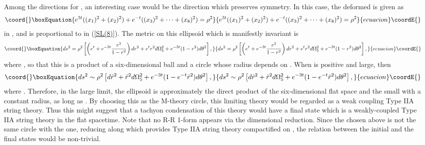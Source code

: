 \documentclass[a4paper,a4paper]{article}
\begin{document}
Among the directions for \coordHE{}, an interesting case would be the direction which preserves 
\coordHE{} symmetry. 
In this case, the deformed \coordHE{} is given as 
\begin{equation}\coord{}\boxEquation{
e^{3t}((x_1)^2+(x_2)^2)+e^{-t}((x_3)^2+\cdots+(x_8)^2)=\rho^2
}{
e^{3t}((x_1)^2+(x_2)^2)+e^{-t}((x_3)^2+\cdots+(x_8)^2)=\rho^2
}{ecuacion}\coordE{}\end{equation}
in \coordHE{}, and \coordHE{} is proportional to \coordHE{} in (\ref{SL(8)}). 
The metric on this ellipsoid which is manifestly \coordHE{} invariant is 
\begin{equation}\coord{}\boxEquation{
ds^2 = \rho^2\left[ \left(e^t+e^{-3t}\frac{r^2}{1-r^2}\right)dr^2+e^tr^2d\Omega_5^2+e^{-3t}(1-r^2)d\theta^2
       \right],
}{
ds^2 = \rho^2\left[ \left(e^t+e^{-3t}\frac{r^2}{1-r^2}\right)dr^2+e^tr^2d\Omega_5^2+e^{-3t}(1-r^2)d\theta^2
       \right],
}{ecuacion}\coordE{}\end{equation}
where \coordHE{}, so that this is a product of a six-dimensional ball and a circle whose radius depends on \coordHE{}. 
When \coordHE{} is positive and large, then 
\begin{equation}\coord{}\boxEquation{
ds^2 \sim \rho^2\left[ d\tilde{r}^2+\tilde{r}^2d\Omega_5^2+e^{-3t}(1-e^{-t}\tilde{r}^2)d\theta^2\right],
}{
ds^2 \sim \rho^2\left[ d\tilde{r}^2+\tilde{r}^2d\Omega_5^2+e^{-3t}(1-e^{-t}\tilde{r}^2)d\theta^2\right],
}{ecuacion}\coordE{}\end{equation}
where \coordHE{}. 
Therefore, in the large \coordHE{} limit, the ellipsoid is approximately the direct product of the six-dimensional flat 
space and the small \coordHE{} with a constant radius, as long as \coordHE{}. 
By choosing this \coordHE{} as the M-theory circle, this limiting theory would be regarded as a weak coupling 
Type IIA string theory. 
Thus this might suggest that a tachyon condensation of this theory would have a final state which is a 
weakly-coupled Type IIA string theory in the flat spacetime. 
Note that no R-R 1-form appears via the dimensional reduction. 
Since the \coordHE{} chosen above is not the same circle with the one, reducing along which provides Type IIA string 
theory compactified on \coordHE{}, the relation between the initial and the final states would be non-trivial. 
\end{document}
